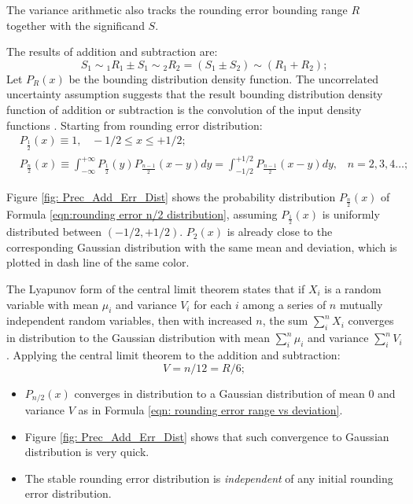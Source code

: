 \documentclass[twoside]{article}
\numberwithin{equation}{section}
\newcommand{\tilt}{\!\!\sim\!\!}
\newcommand{\eqspace}{\;\;\;}
\begin{document}
The variance arithmetic also tracks the rounding error bounding range $R$ together with the significand $S$. 

The results of addition and subtraction are:
\begin{equation}
\label{eqn: rounding error +-}
S_1 \tilt_1 R_1 \pm S_1 \tilt_2 R_2 = (S_{1} \pm S_{2}) \tilt (R_1 + R_2);
\end{equation}
Let $P_R(x)$ be the bounding distribution density function.
The uncorrelated uncertainty assumption suggests that the result bounding distribution density function of addition or subtraction is the convolution of the input density functions \cite{Probability_Statistics}.  
Starting from rounding error distribution:
\begin{align}
\label{eqn: rounding error 1/2 distribution}
& P_{\frac{1}{2}}(x) \equiv 1, \eqspace  -1/2 \leq x \leq +1/2;  \\
\label{eqn:rounding error n/2 distribution}
& P_{\frac{n}{2}}(x) \equiv \int _{-\infty}^{+\infty}P_{\frac{1}{2}}(y)P_{\frac{n-1}{2}}(x-y)dy=\int _{-1/2}^{+1/2}P_{\frac{n-1}{2}}(x-y) dy,\eqspace n=2,3,4\dots;
\end{align}

Figure \ref{fig: Prec_Add_Err_Dist} shows the probability distribution $P_{\frac{n}{2}}(x)$ of Formula \eqref{eqn:rounding error n/2 distribution}, assuming $P_{\frac{1}{2}}(x)$ is uniformly distributed between $(-1/2, +1/2)$.  
$P_{2}(x)$ is already close to the corresponding Gaussian distribution with the same mean and deviation, which is plotted in dash line of the same color.

The Lyapunov form of the central limit theorem \cite{Probability_Statistics} states that if $X_i$ is a random variable with mean $\mu_i$ and variance $V_i$ for each $i$ among a series of $n$ mutually independent random variables, then with increased $n$, the sum $\sum\limits_{i}^{n} X_i$ converges in distribution to the Gaussian distribution with mean $\sum\limits_{i}^{n} \mu_i$ and variance $\sum\limits_{i}^{n} V_i$. Applying the central limit theorem to the addition and subtraction: 
\begin{equation}
\label{eqn: rounding error range vs deviation}
V = n/12 = R/6;
\end{equation}
\begin{itemize}
\item $P_{n/2}(x)$ converges in distribution to a Gaussian distribution of mean $0$ and variance $V$ as in Formula \eqref{eqn: rounding error range vs deviation}.

\item Figure \ref{fig: Prec_Add_Err_Dist} shows that such convergence to Gaussian distribution is very quick. 

\item The stable rounding error distribution is \emph{independent} of any initial rounding error distribution. 
\end{itemize} 
\end{document}
